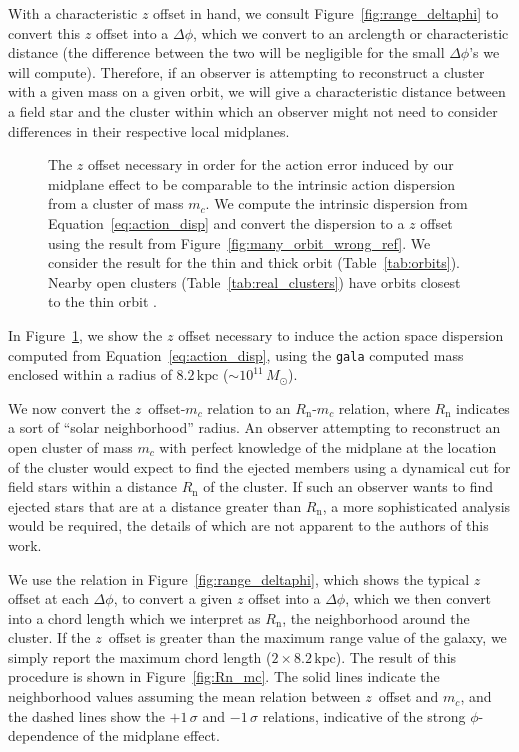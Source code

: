 \documentclass[twocolumn]{aastex62}
\newcommand{\kpc}{\text{kpc}}
\newcommand{\n}{\text{n}}
\begin{document}
With a characteristic $z$ offset in hand, we consult
Figure~\ref{fig:range_deltaphi} to convert this $z$ offset into a $\Delta
\phi$, which we convert to an arclength or characteristic distance (the
difference between the two will be negligible for the small $\Delta \phi$'s we
will compute). Therefore, if an observer is attempting to reconstruct a
cluster with a given mass on a given orbit, we will give a characteristic
distance between a field star and the cluster within which an observer might
not need to consider differences in their respective local midplanes.

\begin{figure}
\caption{The $z$ offset necessary in order for the action error induced by our
midplane effect to be comparable to the intrinsic action dispersion from a
cluster of mass $m_c$. We compute the intrinsic dispersion from
Equation~\ref{eq:action_disp} and convert the dispersion to a $z$ offset using
the result from Figure~\ref{fig:many_orbit_wrong_ref}. We consider the result
for the thin and thick orbit (Table~\ref{tab:orbits}). Nearby open clusters
(Table~\ref{tab:real_clusters}) have orbits closest to the thin orbit .}
\label{fig:cluster_offset}
\end{figure}

In Figure~\ref{fig:cluster_offset}, we show the $z$ offset necessary to induce
the action space dispersion computed from Equation~\ref{eq:action_disp}, using
the \texttt{gala} computed mass enclosed within a radius of $8.2\,\kpc$ ($\sim
10^{11}\,M_{\odot}$).

We now convert the $z$~offset-$m_c$ relation to an $R_{\n}$-$m_c$ relation,
where $R_{\n}$ indicates a sort of ``solar neighborhood'' radius. An observer
attempting to reconstruct an open cluster of mass $m_c$ with perfect knowledge
of the midplane at the location of the cluster would expect to find the
ejected members using a dynamical cut for field stars within a distance
$R_{\n}$ of the cluster. If such an observer wants to find ejected stars that
are at a distance greater than $R_{\n}$, a more sophisticated analysis would
be required, the details of which are not apparent to the authors of this
work.

We use the relation in Figure~\ref{fig:range_deltaphi}, which shows the
typical $z$ offset at each $\Delta \phi$, to convert a given $z$ offset into a
$\Delta\phi$, which we then convert into a chord length which we interpret as
$R_{\n}$, the neighborhood around the cluster. If the $z$~offset is greater
than the maximum range value of the galaxy, we simply report the maximum chord
length ($2\times8.2\,\kpc$). The result of this procedure is shown in
Figure~\ref{fig:Rn_mc}. The solid lines indicate the neighborhood values
assuming the mean relation between $z$~offset and $m_c$, and the dashed lines
show the $+1\,\sigma$ and $-1\,\sigma$ relations, indicative of the strong
$\phi$-dependence of the midplane effect.
\end{document}
